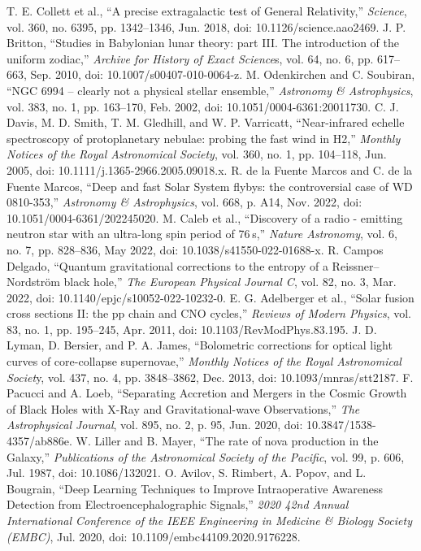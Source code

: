 \documentclass[conference]{IEEEtran}
\begin{document}
\begin{thebibliography}{00}
 T. E. Collett et al., “A precise extragalactic test of General Relativity,” \textit{Science}, vol. 360, no. 6395, pp. 1342–1346, Jun. 2018, doi: 10.1126/science.aao2469.
 J. P. Britton, “Studies in Babylonian lunar theory: part III. The introduction of the uniform zodiac,” \textit{Archive for History of Exact Science}s, vol. 64, no. 6, pp. 617–663, Sep. 2010, doi: 10.1007/s00407-010-0064-z.
 M. Odenkirchen and C. Soubiran, “NGC 6994 – clearly not a physical stellar ensemble,” \textit{Astronomy \& Astrophysics}, vol. 383, no. 1, pp. 163–170, Feb. 2002, doi: 10.1051/0004-6361:20011730.
 C. J. Davis, M. D. Smith, T. M. Gledhill, and W. P. Varricatt, “Near-infrared echelle spectroscopy of protoplanetary nebulae: probing the fast wind in H2,” \textit{Monthly Notices of the Royal Astronomical Society}, vol. 360, no. 1, pp. 104–118, Jun. 2005, doi: 10.1111/j.1365-2966.2005.09018.x.
 R. de la Fuente Marcos and C. de la Fuente Marcos, “Deep and fast Solar System flybys: the controversial case of WD 0810-353,” \textit{Astronomy \& Astrophysics}, vol. 668, p. A14, Nov. 2022, doi: 10.1051/0004-6361/202245020.
 M. Caleb et al., “Discovery of a radio - emitting neutron star with an ultra-long spin period of 76 s,” \textit{Nature Astronomy}, vol. 6, no. 7, pp. 828–836, May 2022, doi: 10.1038/s41550-022-01688-x.
 R. Campos Delgado, “Quantum gravitational corrections to the entropy of a Reissner–Nordström black hole,” \textit{The European Physical Journal C}, vol. 82, no. 3, Mar. 2022, doi: 10.1140/epjc/s10052-022-10232-0.
 E. G. Adelberger et al., “Solar fusion cross sections II: the pp chain and CNO cycles,” \textit{Reviews of Modern Physics}, vol. 83, no. 1, pp. 195–245, Apr. 2011, doi: 10.1103/RevModPhys.83.195.
 J. D. Lyman, D. Bersier, and P. A. James, “Bolometric corrections for optical light curves of core-collapse supernovae,” \textit{Monthly Notices of the Royal Astronomical Societ}y, vol. 437, no. 4, pp. 3848–3862, Dec. 2013, doi: 10.1093/mnras/stt2187.
 F. Pacucci and A. Loeb, “Separating Accretion and Mergers in the Cosmic Growth of Black Holes with X-Ray and Gravitational-wave Observations,” \textit{The Astrophysical Journal}, vol. 895, no. 2, p. 95, Jun. 2020, doi: 10.3847/1538-4357/ab886e.
 W. Liller and B. Mayer, “The rate of nova production in the Galaxy,” \textit{Publications of the Astronomical Society of the Pacific}, vol. 99, p. 606, Jul. 1987, doi: 10.1086/132021.
 O. Avilov, S. Rimbert, A. Popov, and L. Bougrain, “Deep Learning Techniques to Improve Intraoperative Awareness Detection from Electroencephalographic Signals,” \textit{2020 42nd Annual International Conference of the IEEE Engineering in Medicine \& Biology Society (EMBC)}, Jul. 2020, doi: 10.1109/embc44109.2020.9176228.
\end{thebibliography}
\end{document}
